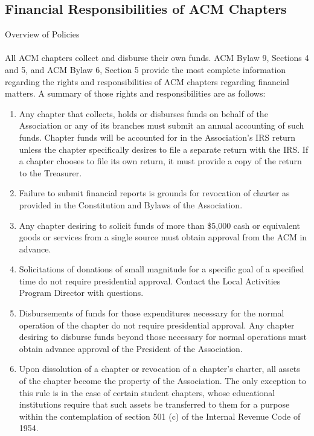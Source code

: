 \subsection{Financial Responsibilities of ACM Chapters}
Overview of Policies
\\
\\
All ACM chapters collect and disburse their own funds. ACM Bylaw 9, Sections 4 and 5, and ACM Bylaw 6, Section 5 provide the most complete information regarding the rights and responsibilities of ACM chapters regarding financial matters. A summary of those rights and responsibilities are as follows:
	\begin{enumerate}
		\item Any chapter that collects, holds or disburses funds on behalf of the Association or any of its branches must submit an annual accounting of such funds.
Chapter funds will be accounted for in the Association's IRS return unless the chapter specifically desires to file a separate return with the IRS. If a chapter chooses to file its own return, it must provide a copy of the return to the Treasurer.
		\item Failure to submit financial reports is grounds for revocation of charter as provided in the Constitution and Bylaws of the Association.
        \item Any chapter desiring to solicit funds of more than \$5,000 cash or equivalent goods or services from a single source must obtain approval from the ACM in advance.
        \item  Solicitations of donations of small magnitude for a specific goal of a specified time do not require presidential approval. Contact the Local Activities Program Director with questions.
        \item Disbursements of funds for those expenditures necessary for the normal operation of the chapter do not require presidential approval. Any chapter desiring to disburse funds beyond those necessary for normal operations must obtain advance approval of the President of the Association.
        \item Upon dissolution of a chapter or revocation of a chapter's charter, all assets of the chapter become the property of the Association. The only exception to this rule is in the case of certain student chapters, whose educational institutions require that such assets be transferred to them for a purpose within the contemplation of section 501 (c) of the Internal Revenue Code of 1954.
	\end{enumerate}
    
